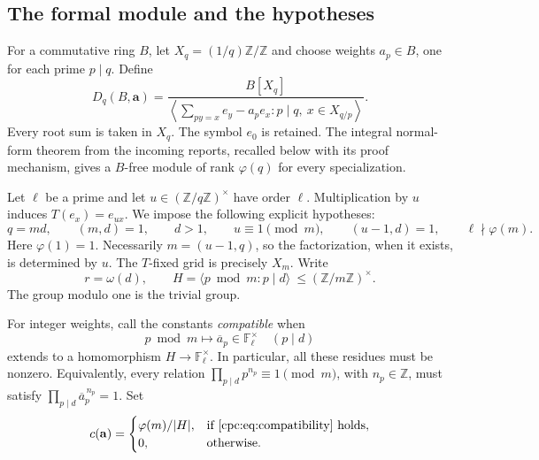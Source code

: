 \documentclass[11pt,a4paper]{article}
\numberwithin{equation}{section}
\theoremstyle{definition}
\theoremstyle{remark}
\begin{document}
\subsection{The formal module and the hypotheses}

For a commutative ring $B$, let $X_q=(1/q)\mathbb Z/\mathbb Z$ and
choose weights $a_p\in B$, one for each prime $p\mid q$. Define
\begin{equation}\label{cpc:eq:distribution}
 D_q(B,\mathbf a)=
 \frac{B[X_q]}{
 \left\langle\displaystyle\sum_{py=x}e_y-a_pe_x:
                    p\mid q,\ x\in X_{q/p}\right\rangle}.
\end{equation}
Every root sum is taken in $X_q$. The symbol $e_0$ is retained.
The integral normal-form theorem from the incoming reports, recalled
below with its proof mechanism, gives a $B$-free module of rank
$\varphi(q)$ for every specialization.

Let $\ell$ be a prime and let $u\in(\mathbb Z/q\mathbb Z)^\times$
have order $\ell$. Multiplication by $u$ induces
$T(e_x)=e_{ux}$. We impose the following explicit hypotheses:
\begin{equation}\label{cpc:eq:hypotheses}
 q=md,\qquad (m,d)=1,\qquad d>1,\qquad
 u\equiv1\pmod m,\qquad (u-1,d)=1,\qquad
 \ell\nmid\varphi(m).
\end{equation}
Here $\varphi(1)=1$. Necessarily $m=(u-1,q)$, so the factorization,
when it exists, is determined by $u$. The $T$-fixed grid is precisely
$X_m$. Write
\begin{equation}\label{cpc:eq:parameters}
 r=\omega(d),\qquad
 H=\langle p\bmod m:p\mid d\rangle
       \ \le (\mathbb Z/m\mathbb Z)^\times.
\end{equation}
The group modulo one is the trivial group.

For integer weights, call the constants \emph{compatible} when
\begin{equation}\label{cpc:eq:compatibility}
 p\bmod m\longmapsto \overline a_p\in\mathbb F_\ell^\times
 \quad(p\mid d)
\end{equation}
extends to a homomorphism $H\to\mathbb F_\ell^\times$.
In particular, all these residues must be nonzero. Equivalently,
every relation $\prod_{p\mid d}p^{n_p}\equiv1\pmod m$, with
$n_p\in\mathbb Z$, must satisfy
$\prod_{p\mid d}\overline a_p^{\,n_p}=1$.
Set
\begin{equation}\label{cpc:eq:multiplicity}
 c(\mathbf a)=
 \begin{cases}
 \varphi(m)/|H|,&\text{if \eqref{cpc:eq:compatibility} holds},\\
 0,&\text{otherwise}.
 \end{cases}
\end{equation}
\end{document}
